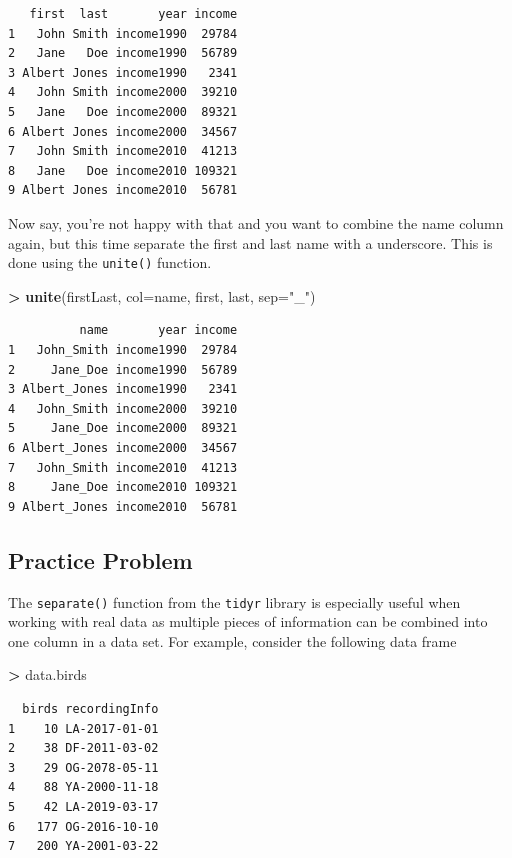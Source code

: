 \documentclass[]{krantz}
\makeatletter
\newenvironment{Shaded}{\begin{snugshade}}{\end{snugshade}}
\newcommand{\KeywordTok}[1]{\textcolor[rgb]{0.27,0.27,0.27}{\textbf{#1}}}
\newcommand{\DataTypeTok}[1]{\textcolor[rgb]{0.27,0.27,0.27}{#1}}
\newcommand{\StringTok}[1]{\textcolor[rgb]{0.5,0.5,0.5}{#1}}
\newcommand{\OperatorTok}[1]{\textcolor[rgb]{0.43,0.43,0.43}{\textbf{#1}}}
\newcommand{\NormalTok}[1]{#1}
\newenvironment{kframe}{%
\medskip{}
\setlength{\fboxsep}{.8em}
 \def\at@end@of@kframe{}%
 \ifinner\ifhmode%
  \def\at@end@of@kframe{\end{minipage}}%
  \begin{minipage}{\columnwidth}%
 \fi\fi%
 \def\FrameCommand##1{\hskip\@totalleftmargin \hskip-\fboxsep
 \colorbox{shadecolor}{##1}\hskip-\fboxsep
     \hskip-\linewidth \hskip-\@totalleftmargin \hskip\columnwidth}%
 \MakeFramed {\advance\hsize-\width
   \@totalleftmargin\z@ \linewidth\hsize
   \@setminipage}}%
 {\par\unskip\endMakeFramed%
 \at@end@of@kframe}
\renewenvironment{Shaded}{\begin{kframe}}{\end{kframe}}
\makeatother
\begin{document}
\begin{verbatim}
   first  last       year income
1   John Smith income1990  29784
2   Jane   Doe income1990  56789
3 Albert Jones income1990   2341
4   John Smith income2000  39210
5   Jane   Doe income2000  89321
6 Albert Jones income2000  34567
7   John Smith income2010  41213
8   Jane   Doe income2010 109321
9 Albert Jones income2010  56781
\end{verbatim}

Now say, you're not happy with that and you want to combine the name
column again, but this time separate the first and last name with a
underscore. This is done using the \texttt{unite()} function.

\begin{Shaded}
\begin{Highlighting}[]
\OperatorTok{>}\StringTok{ }\KeywordTok{unite}\NormalTok{(firstLast, }\DataTypeTok{col=}\NormalTok{name, first, last, }\DataTypeTok{sep=}\StringTok{"_"}\NormalTok{)}
\end{Highlighting}
\end{Shaded}

\begin{verbatim}
          name       year income
1   John_Smith income1990  29784
2     Jane_Doe income1990  56789
3 Albert_Jones income1990   2341
4   John_Smith income2000  39210
5     Jane_Doe income2000  89321
6 Albert_Jones income2000  34567
7   John_Smith income2010  41213
8     Jane_Doe income2010 109321
9 Albert_Jones income2010  56781
\end{verbatim}

\subsection{Practice Problem}\label{practice-problem-7}

The \texttt{separate()} function from the \texttt{tidyr} library is
especially useful when working with real data as multiple pieces of
information can be combined into one column in a data set. For example,
consider the following data frame

\begin{Shaded}
\begin{Highlighting}[]
\OperatorTok{>}\StringTok{ }\NormalTok{data.birds}
\end{Highlighting}
\end{Shaded}

\begin{verbatim}
  birds recordingInfo
1    10 LA-2017-01-01
2    38 DF-2011-03-02
3    29 OG-2078-05-11
4    88 YA-2000-11-18
5    42 LA-2019-03-17
6   177 OG-2016-10-10
7   200 YA-2001-03-22
\end{verbatim}
\end{document}
